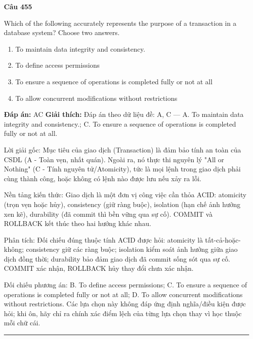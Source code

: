 \documentclass[11pt,a4paper]{article}
\newenvironment{question}[1]{%
  \par\vspace{1em}\noindent\textbf{\large Câu #1}\par\vspace{0.4em}
}{%
  \par\vspace{1em}\hrule\vspace{0.6em}
}
\newenvironment{choices}{%
  \begin{enumerate}[label=\textbf{\Alph*.},leftmargin=2.2em,itemsep=2pt,topsep=3pt]
}{%
  \end{enumerate}
}
\newcommand{\choice}{\item}
\begin{document}
\begin{question}{455}
Which of the following accurately represents the purpose of a transaction in a database system? Choose two answers.
\begin{choices}
\choice To maintain data integrity and consistency.
\choice To define access permissions
\choice To ensure a sequence of operations is completed fully or not at all
\choice To allow concurrent modifications without restrictions
\end{choices}
\textbf{Đáp án:} AC
\textbf{Giải thích:} Đáp án theo dữ liệu đề: A, C — A. To maintain data integrity and consistency.; C. To ensure a sequence of operations is completed fully or not at all.

Lời giải gốc: Mục tiêu của giao dịch (Transaction) là đảm bảo tính an toàn của CSDL (A - Toàn vẹn, nhất quán). Ngoài ra, nó thực thi nguyên lý "All or Nothing" (C - Tính nguyên tử/Atomicity), tức là mọi lệnh trong giao dịch phải cùng thành công, hoặc không có lệnh nào được lưu nếu xảy ra lỗi.

Nền tảng kiến thức: Giao dịch là một đơn vị công việc cần thỏa ACID: atomicity (trọn vẹn hoặc hủy), consistency (giữ ràng buộc), isolation (hạn chế ảnh hưởng xen kẽ), durability (đã commit thì bền vững qua sự cố). COMMIT và ROLLBACK kết thúc theo hai hướng khác nhau.

Phân tích: Đối chiếu đúng thuộc tính ACID được hỏi: atomicity là tất-cả-hoặc-không; consistency giữ các ràng buộc; isolation kiểm soát ảnh hưởng giữa giao dịch đồng thời; durability bảo đảm giao dịch đã commit sống sót qua sự cố. COMMIT xác nhận, ROLLBACK hủy thay đổi chưa xác nhận.

Đối chiếu phương án: B. To define access permissions; C. To ensure a sequence of operations is completed fully or not at all; D. To allow concurrent modifications without restrictions. Các lựa chọn này không đáp ứng định nghĩa/điều kiện được hỏi; khi ôn, hãy chỉ ra chính xác điểm lệch của từng lựa chọn thay vì học thuộc mỗi chữ cái.
\end{question}
\end{document}
